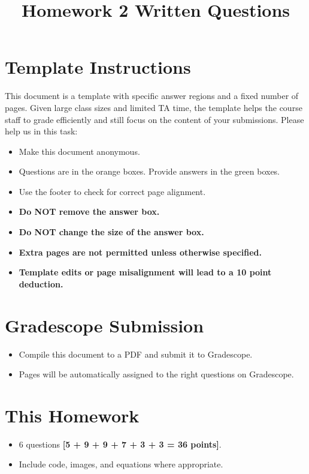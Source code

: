 \documentclass[11pt]{article}
\date{}
\title{\vspace{-1cm}Homework 2 Written Questions}
\begin{document}
\maketitle
\thispagestyle{fancy}

\section*{Template Instructions}

This document is a template with specific answer regions and a fixed number of pages. Given large class sizes and limited TA time, the template helps the course staff to grade efficiently and still focus on the content of your submissions. Please help us in this task:
 
\begin{itemize}
  \item Make this document anonymous.
  
  \item Questions are in the orange boxes. Provide answers in the green boxes.
  \item Use the footer to check for correct page alignment.

  \item \textbf{Do NOT remove the answer box.}
  \item \textbf{Do NOT change the size of the answer box.}
  \item \textbf{Extra pages are not permitted unless otherwise specified.}
  \item \textbf{Template edits or page misalignment will lead to a 10 point deduction.}
\end{itemize}

\section*{Gradescope Submission}
\begin{itemize}
  \item Compile this document to a PDF and submit it to Gradescope.
  \item Pages will be automatically assigned to the right questions on Gradescope.
\end{itemize}

\section*{This Homework}
\begin{itemize}
    \item 6 questions \textbf{[5 + 9 + 9 + 7 + 3 + 3 = 36 points]}.
    \item Include code, images, and equations where appropriate.
\end{itemize}
\end{document}
